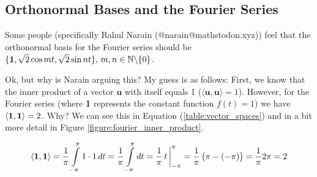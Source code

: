 \documentclass{article}
\theoremstyle{definition}
\begin{document}
\smallskip
\subsection{Orthonormal Bases and the Fourier Series}
Some people (specifically Rahul Narain (@narain@mathstodon.xyz))
feel that the orthonormal basis for the Fourier series should be
$\{{\bf 1},\sqrt{2} \cos mt,\sqrt{2} \sin nt\}, \, m,n \in \mathbb{N}
\backslash \{0\}$. 

\bigskip
\noindent
Ok, but why is Narain arguing this? My guess is as follows:
First, we know that the inner product of a vector $\mathbf{u}$ 
with itself equals 1 ($\langle \mathbf{u},\mathbf{u} \rangle = 
1$). However, for the Fourier series (where {\bf 1} represents the 
constant function $f(t) = 1$) we have $\langle {\bf 1},{\bf 1}
\rangle = 2$. Why? We can see this in Equation (\ref{table:vector_spaces}) 
and in a bit more detail in Figure \ref{figure:fourier_inner_product}.

\begin{equation}
	\langle {\bf 1},{\bf 1} \rangle											= 
		\frac{1}{\pi}\int\limits_{-\pi}^{\pi} 1 \cdot 1 \, dt	= 
		\frac{1}{\pi}\int\limits_{-\pi}^{\pi} dt				= 
		\frac{1}{\pi}  \, t \, \bigg |^{\pi}_{-\pi}				= 
		\frac{1}{\pi} \left (\pi - (-\pi) \right )				= 
		\frac{1}{\pi} 2\pi										= 
		2
\label{eqn:1}
\end{equation}
\end{document}
